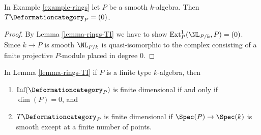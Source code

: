 \begin{lemma}
\label{lemma-smooth}
In Example \ref{example-rings} let $P$ be a smooth $k$-algebra. Then
$T\Deformationcategory_P = (0)$.
\end{lemma}

\begin{proof}
By Lemma \ref{lemma-rings-TI} we have to show
$\text{Ext}^1_P(\NL_{P/k}, P) = (0)$.
Since $k \to P$ is smooth $\NL_{P/k}$ is quasi-isomorphic to the
complex consisting of a finite projective
$P$-module placed in degree $0$.
\end{proof}

\begin{lemma}
\label{lemma-finite-type-rings-TI}
In Lemma \ref{lemma-rings-TI} if $P$ is a finite type $k$-algebra, then
\begin{enumerate}
\item $\text{Inf}(\Deformationcategory_P)$ is finite dimensional if and only if
$\dim(P) = 0$, and
\item $T\Deformationcategory_P$ is finite dimensional if
$\Spec(P) \to \Spec(k)$ is smooth except at a finite number of points.
\end{enumerate}
\end{lemma}

